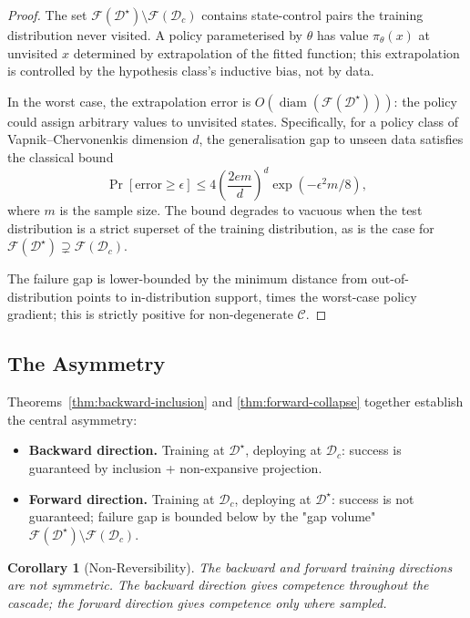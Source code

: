 \documentclass[11pt,twocolumn,a4paper]{article}
\newtheorem{corollary}[theorem]{Corollary}
\DeclareMathOperator{\diam}{diam}
\newcommand{\cF}{\mathcal{F}}
\newcommand{\cD}{\mathcal{D}}
\newcommand{\cC}{\mathcal{C}}
\begin{document}
\begin{proof}
The set $\cF(\cD^\star) \setminus \cF(\cD_c)$ contains state-control pairs the training distribution never visited. A policy parameterised by $\theta$ has value $\pi_\theta(x)$ at unvisited $x$ determined by extrapolation of the fitted function; this extrapolation is controlled by the hypothesis class's inductive bias, not by data.

In the worst case, the extrapolation error is $O(\diam(\cF(\cD^\star)))$: the policy could assign arbitrary values to unvisited states. Specifically, for a policy class of Vapnik--Chervonenkis dimension $d$, the generalisation gap to unseen data satisfies the classical bound \cite{valiant1984theory,blumer1989learnability,vapnik1998statistical,shalev2014understanding}
\begin{equation}
\Pr[\text{error} \ge \epsilon] \le 4 \left(\frac{2em}{d}\right)^d \exp(-\epsilon^2 m/8),
\end{equation}
where $m$ is the sample size. The bound degrades to vacuous when the test distribution is a strict superset of the training distribution, as is the case for $\cF(\cD^\star) \supsetneq \cF(\cD_c)$.

The failure gap is lower-bounded by the minimum distance from out-of-distribution points to in-distribution support, times the worst-case policy gradient; this is strictly positive for non-degenerate $\cC$.
\end{proof}

\subsection{The Asymmetry}

Theorems~\ref{thm:backward-inclusion} and \ref{thm:forward-collapse} together establish the central asymmetry:

\begin{itemize}[leftmargin=*,itemsep=2pt]
\item \textbf{Backward direction.} Training at $\cD^\star$, deploying at $\cD_c$: success is guaranteed by inclusion + non-expansive projection.
\item \textbf{Forward direction.} Training at $\cD_c$, deploying at $\cD^\star$: success is not guaranteed; failure gap is bounded below by the "gap volume" $\cF(\cD^\star) \setminus \cF(\cD_c)$.
\end{itemize}

\begin{corollary}[Non-Reversibility]
\label{cor:non-reversible}
The backward and forward training directions are not symmetric. The backward direction gives competence throughout the cascade; the forward direction gives competence only where sampled.
\end{corollary}
\end{document}
